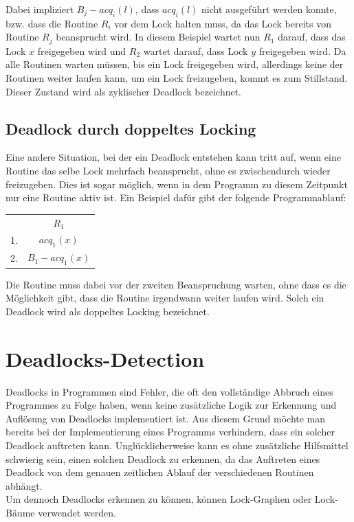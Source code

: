 Dabei impliziert $B_j-acq_i(l)$, dass $acq_{i}(l)$ nicht ausgeführt werden konnte,
bzw. dass die Routine $R_i$ vor dem Lock halten muss, da das Lock bereits von 
Routine $R_j$ beansprucht wird. In diesem Beispiel wartet nun $R_1$ 
darauf, dass das Lock $x$ freigegeben wird und $R_2$ wartet darauf, dass Lock 
$y$ freigegeben wird. Da alle Routinen warten müssen, bis ein Lock freigegeben 
wird, allerdings keine der Routinen weiter laufen kann, um ein Lock freizugeben, 
kommt es zum Stillstand. Dieser Zustand wird als zyklischer Deadlock bezeichnet.
\subsection{Deadlock durch doppeltes Locking}\label{Kap::Theo:DoubleLocking}
Eine andere Situation, bei der ein Deadlock entstehen kann tritt auf, wenn 
eine Routine das selbe Lock mehrfach beansprucht, ohne es zwischendurch wieder 
freizugeben. Dies ist sogar möglich, wenn in dem Programm zu diesem Zeitpunkt
nur eine Routine aktiv ist. Ein Beispiel dafür gibt der folgende Programmablauf:
\begin{table}[H]
    \centering
    \begin{tabular}{cc}
        & $R_1$ \\
        1. & $acq_{1}(x)$ \\
        2. & $B_1-acq_1(x)$
    \end{tabular}
\end{table}
Die Routine muss dabei vor der zweiten Beanspruchung warten,
ohne dass es die Möglichkeit gibt, dass die Routine irgendwann weiter laufen wird.
Solch ein Deadlock wird als doppeltes Locking bezeichnet.\\
\section{Deadlocks-Detection}
Deadlocks in Programmen sind Fehler, die oft den vollständige Abbruch eines 
Programmes zu Folge haben, wenn keine zusätzliche Logik zur Erkennung und Auflösung von 
Deadlocks implementiert ist. Aus diesem Grund möchte man bereits bei der 
Implementierung eines Programms verhindern, dass ein solcher Deadlock auftreten 
kann. Unglücklicherweise kann es ohne zusätzliche Hilfsmittel schwierig sein, 
einen solchen Deadlock zu erkennen, da das Auftreten eines Deadlock von dem 
genauen zeitlichen Ablauf der verschiedenen Routinen abhängt.\\
Um dennoch Deadlocks 
erkennen zu können, können Lock-Graphen oder Lock-Bäume verwendet werden.
